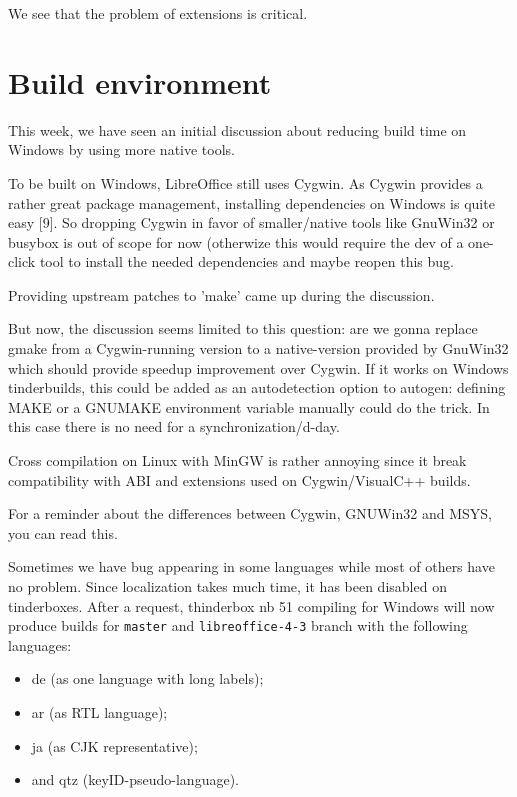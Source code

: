 \documentclass{article}
\begin{document}
We see that the problem of extensions is critical\cite{extensionsCompatibility}.

\section{Build environment}

This week, we have seen an initial discussion about reducing build time on Windows by using more native tools.

To be built on Windows, LibreOffice still uses Cygwin. As Cygwin provides a rather great package management, installing dependencies on Windows is quite easy [9]. So dropping Cygwin in favor of smaller/native tools like GnuWin32 or busybox is out of scope for now (otherwize this would require the dev of a one-click tool to install the needed dependencies \cite{winBuidDependenciesTool} and maybe reopen this bug\cite{winBuildDependenciesInstall}.

Providing upstream patches to 'make' came up during the discussion.

But now, the discussion seems limited to this question: are we gonna replace gmake from a Cygwin-running version to a native-version provided by GnuWin32 which should provide speedup improvement over Cygwin. If it works on Windows tinderbuilds, this could be added as an autodetection option to autogen: defining MAKE or a GNUMAKE environment variable manually could do the trick. In this case there is no need for a synchronization/d-day\cite{winBuildGmakeReplaceGnuWin32}.

Cross compilation on Linux with MinGW is rather annoying since it break compatibility with ABI and extensions used on Cygwin/VisualC++ builds.

For a reminder about the differences between Cygwin, GNUWin32 and MSYS, you can read this\cite{winBuildCygwinMsysGnuWin32Comparison}.


Sometimes we have bug appearing in some languages while most of others have no problem. Since localization takes much time, it has been disabled on tinderboxes. After a request, thinderbox nb 51 compiling for Windows will now produce builds for \lstinline{master} and \lstinline{libreoffice-4-3} branch with the following languages:
\begin{itemize}
    \item de (as one language with long labels);
    \item ar (as RTL language);
    \item ja (as CJK representative);
    \item and qtz (keyID-pseudo-language).
\end{itemize}
\end{document}
